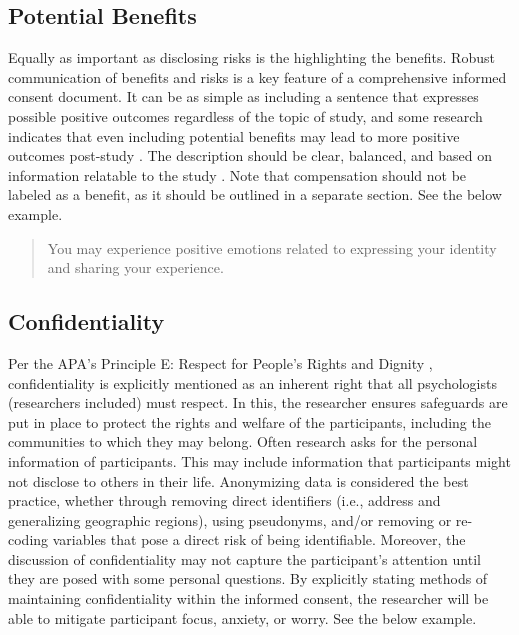 \documentclass[
  11pt,
]{book}
\begin{document}
\subsection{Potential Benefits}\label{potential-benefits}

Equally as important as disclosing risks is the highlighting the benefits. Robust communication of benefits and risks is a key feature of a comprehensive informed consent document. It can be as simple as including a sentence that expresses possible positive outcomes regardless of the topic of study, and some research indicates that even including potential benefits may lead to more positive outcomes post-study \citep{nusbaum_communicating_2017, sullivan_practical_1993, weston_evaluating_1997}. The description should be clear, balanced, and based on information relatable to the study \citep{nusbaum_communicating_2017}. Note that compensation should not be labeled as a benefit, as it should be outlined in a separate section. See the below example.

\begin{quote}
You may experience positive emotions related to expressing your identity and sharing your experience.
\end{quote}

\subsection{Confidentiality}\label{confidentiality}

Per the APA's Principle E: Respect for People's Rights and Dignity \citep{american_psychological_association_ethical_2017}, confidentiality is explicitly mentioned as an inherent right that all psychologists (researchers included) must respect. In this, the researcher ensures safeguards are put in place to protect the rights and welfare of the participants, including the communities to which they may belong. Often research asks for the personal information of participants. This may include information that participants might not disclose to others in their life. Anonymizing data is considered the best practice, whether through removing direct identifiers (i.e., address and generalizing geographic regions), using pseudonyms, and/or removing or re-coding variables that pose a direct risk of being identifiable. Moreover, the discussion of confidentiality may not capture the participant's attention until they are posed with some personal questions. By explicitly stating methods of maintaining confidentiality within the informed consent, the researcher will be able to mitigate participant focus, anxiety, or worry. See the below example.
\end{document}
